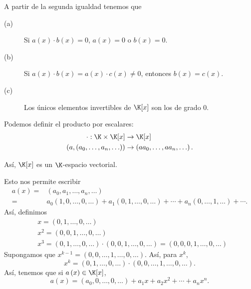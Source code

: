 \begin{fprop}[]
\normalfont A partir de la segunda igualdad tenemos que
\begin{description}
\item[(a)] Si $\displaystyle a\left(x\right) \cdot b\left(x\right) = 0 $, $\displaystyle a\left(x\right) = 0 $ o $\displaystyle b\left(x\right)=0 $.
\item[(b)] Si $\displaystyle a\left(x\right) \cdot b\left(x\right) = a\left(x\right) \cdot c\left(x\right) \neq 0 $, entonces $\displaystyle b\left(x\right) = c\left(x\right) $.
\item[(c)] Los únicos elementos invertibles de $\displaystyle \K[x] $ son los de grado 0.
\end{description}
\end{fprop}
Podemos definir el producto por escalares:
\[
\begin{split}
	\cdot : \K \times \K[x] & \to \K[x] \\
	\left(a, \left(a_{0}, \ldots, a_{n}, \ldots\right)\right) & \to \left(a a_{0}, \ldots, a a_{n}, \ldots\right).
\end{split}
\]
\begin{observation}
\normalfont 
Así, $\displaystyle \K[x] $ es un $\displaystyle \K $-espacio vectorial. 
\end{observation}
Esto nos permite escribir
\[
\begin{split}
	a\left(x\right) = & \left(a_{0}, a_{1}, \ldots, a_{n}, \ldots\right) \\
	= & a_{0}\left(1, 0, \ldots, 0, \ldots\right) + a_{1} \left(0, 1, \ldots, 0, \ldots\right) + \cdots + a_{n}\left(0, \ldots, 1, \ldots\right) + \cdots .
\end{split}
\]
Así, definimos
\[
\begin{split}
& x = \left(0, 1, \ldots, 0, \ldots\right) \\
& x^{2} = \left(0, 0, 1, \ldots, 0, \ldots\right) \\
& x^{3} = \left(0, 1, \ldots, 0, \ldots\right) \cdot  \left(0, 0, 1, \ldots, 0, \ldots\right) = \left(0, 0, 0, 1, \ldots, 0, \ldots\right)
\end{split}
\]
Supongamos que $\displaystyle x^{k -1} = \left(0, 0, \ldots, 1, \ldots , 0, \ldots\right) $. Así, para $\displaystyle x^{k} $,
\[x^{k} = \left(0, 1, \ldots, 0, \ldots\right) \cdot \left(0, 0, \ldots, 1, \ldots, 0, \ldots\right) .\]
Así, tenemos que si $\displaystyle a\left(x\right) \in \K[x] $,
\[a\left(x\right) = \left(a_{0},0, \ldots, 0, \ldots\right) + a_{1}x + a_{2}x^{2} + \cdots + a_{n}x^{n} .\]
